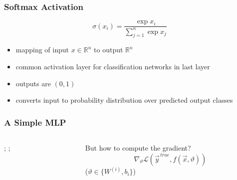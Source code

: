 \documentclass[
  aspectratio=1610, %
  intlimits %
]{beamer}
\begin{document}
 \begin{frame}
 \frametitle{Softmax Activation}
 \begin{equation*}
\sigma(x_i) = \frac{\exp{x_i}}{\sum_{j=1}^{n} \exp{x_j}}
\end{equation*}
\begin{itemize}
\item mapping of input $x \in \mathbb{R}^n$ to output $\mathbb{R}^n$
\item common activation layer for classification networks in last layer
\item outputs are $(0,1)$
\item converts input to probability distribution over predicted output classes
\end{itemize}
\end{frame}

\renewcommand{\inText}[1]{
 $I_{#1}$
}
\renewcommand{\hidText}[1]{
 {$F_{relu}(H_{#1})$}%
}
\renewcommand{\outText}[1]{
 $F_{smax}(O_{#1})$%
}
\renewcommand{\synapseIHText}[2]{%
 {\ifthenelse{\equal{#1}{1}}{}{\small$W^{(I)}_{#1#2}$}}}
\renewcommand{\synapseHOText}[2]{\small$W^{(H)}_{#1#2}$}

 \begin{frame}
 \frametitle{A Simple MLP}

 \begin{columns}
   \begin{column}{.7\textwidth}
     {;
       ;
     }
   \end{column}
   \begin{column}{.28\textwidth}

     \begin{exampleblock}{But how to compute the gradient?}
       \vspace{-1em}
       \Large
       \begin{equation*}
         \nabla_{\vartheta}\mathcal{L} ( \vec{y}^{\,true}, f(\vec{x}, \vartheta) )
       \end{equation*}
       \small
       \centering
     ($\vartheta \in \{W^{(i)}, b_i\}$)
   \end{exampleblock}

   \end{column}
 \end{columns}

\end{frame}
\end{document}
